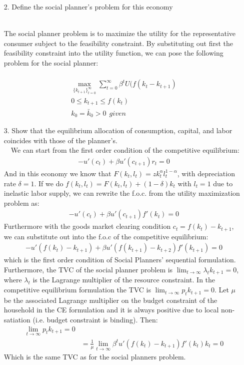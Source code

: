 \documentclass[a4paper]{article}
\begin{document}
\begin{enumerate}
\item[2.] Define the social planner's problem for this economy\\~\

The social planner problem is to maximize the utility for the representative consumer subject to the feasibility constraint. By substituting out first the feasibility constraint into the utility function, we can pose the following problem for the social planner:\\~\
\begin{align*}
\max_{ \{ k_{t+1} \}^{\infty}_{t=0} } \sum^{\infty}_{t=0} \beta^{t} U(f(k_{t} - k_{t+1}) \\
0 \leq k_{t+1} \leq f(k_{t}) \\
k_{0} = \bar{k}_{0} >0 \: \: given
\end{align*}


\item[3.] Show that the equilibrium allocation of consumption, capital, and labor coincides with those of the planner’s.\\~\
We can start from the first order condition of the competitive equilibrium:
\begin{align*}
-u'(c_t) + \beta u'(c_{t+1})r_t = 0
\end{align*}
And in this economy we know that $F(k_t, l_t) = zk_t^{\alpha}l_t^{1-\alpha}$, with depreciation rate $\delta = 1$. If we do $f(k_t, l_t) = F(k_t, l_t) + (1-\delta)k_t$ with $l_t = 1$ due to inelastic labor supply, we can rewrite the f.o.c. from the utility maximization problem as:
\begin{align*}
-u'(c_t) + \beta u'(c_{t+1})f'(k_t) = 0
\end{align*}
Furthermore with the goods market clearing condition $c_t = f(k_t) - k_{t+1}$, we can substitute out into the f.o.c of the competitive equilibrium:
\begin{align*}
-u'(f(k_t) - k_{t+1}) + \beta u'(f(k_{t+1}) - k_{t+2})f'(k_{t+1}) = 0
\end{align*}
which is the first order condition of Social Planners' sequential formulation. Furthermore,  the TVC of the social planner problem is $\lim_{t \rightarrow \infty} \lambda_t k_{t+1} = 0$, where $\lambda_t$ is the Lagrange multiplier of the resource constraint. In the competitive equilibrium formulation the TVC is  $\lim_{t \rightarrow \infty} p_t k_{t+1} = 0$. Let $\mu$ be the associated Lagrange multiplier on the budget constraint of the household in the CE formulation and it is always positive due to local non-satiation (i.e. budget constraint is binding). Then:
\begin{align*}
\lim_{t \rightarrow \infty} p_t k_{t+1} = 0\\
& = \frac{1}{\mu} \lim_{t \rightarrow \infty} \beta^{t} u'(f(k_t)-k_{t+1})f'(k_t)k_t = 0
\end{align*}
Which is the same TVC as for the social planners problem. \\~\


\end{enumerate}
\end{document}
